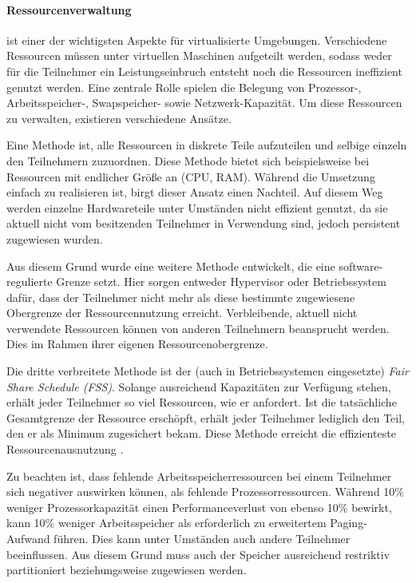 \paragraph{Ressourcenverwaltung} ist einer der wichtigsten Aspekte für virtualisierte Umgebungen.
Verschiedene Ressourcen müssen unter virtuellen Maschinen aufgeteilt werden, sodass weder für die
Teilnehmer ein Leistungseinbruch entsteht noch die Ressourcen ineffizient genutzt werden.
Eine zentrale Rolle spielen die Belegung von Prozessor-, Arbeitsspeicher-,
Swapspeicher- sowie Netzwerk-Kapazität. Um diese Ressourcen zu verwalten, existieren verschiedene
Ansätze.

Eine Methode ist, alle Ressourcen in diskrete Teile aufzuteilen und selbige einzeln den Teilnehmern
zuzuordnen. Diese Methode bietet sich beispielsweise bei Ressourcen mit endlicher Größe an
(CPU, RAM). Während die Umsetzung einfach zu realisieren ist, birgt dieser Ansatz einen Nachteil.
Auf diesem Weg werden einzelne Hardwareteile unter Umständen nicht effizient genutzt,
da sie aktuell nicht vom besitzenden Teilnehmer in Verwendung sind, jedoch persistent zugewiesen wurden.

Aus diesem Grund wurde eine weitere Methode entwickelt, die eine software-regulierte Grenze setzt.
Hier sorgen entweder Hypervisor oder Betriebssystem dafür, dass der Teilnehmer nicht mehr als
diese bestimmte zugewiesene Obergrenze der Ressourcennutzung erreicht. Verbleibende, aktuell
nicht verwendete Ressourcen können von anderen Teilnehmern beansprucht werden. Dies im Rahmen
ihrer eigenen Ressourcenobergrenze\cite{victor10}.

Die dritte verbreitete Methode ist der (auch in Betriebssystemen eingesetzte)
\textit{Fair Share Schedule (FSS)}. Solange ausreichend Kapazitäten zur Verfügung stehen,
erhält jeder Teilnehmer so viel Ressourcen, wie er anfordert. Ist die tatsächliche Gesamtgrenze der
Ressource erschöpft, erhält jeder Teilnehmer lediglich den Teil, den er als Minimum zugesichert bekam.
Diese Methode erreicht die effizienteste Ressourcenausnutzung \cite{victor10}.

Zu beachten ist, dass fehlende Arbeitsspeicherressourcen bei einem Teilnehmer sich negativer auswirken
können, als fehlende Prozessorressourcen. Während 10\% weniger Prozessorkapazität einen
Performanceverlust von ebenso 10\% bewirkt, kann 10\% weniger Arbeitsspeicher als erforderlich zu
erweitertem Paging-Aufwand führen. Dies kann unter Umständen auch andere Teilnehmer beeinflussen.
Aus diesem Grund muss auch der Speicher ausreichend restriktiv partitioniert beziehungsweise zugewiesen werden.

